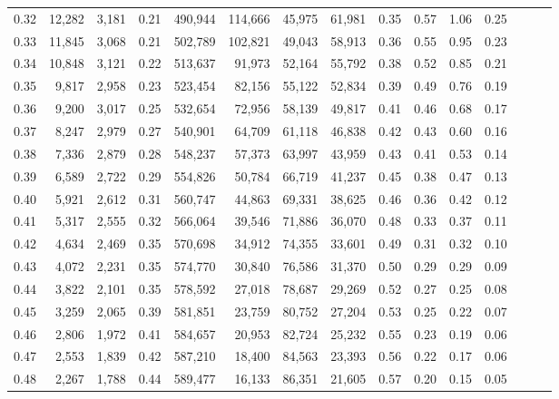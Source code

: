 \begin{tabular}{rrrrrrrrrrrrrrr}
0.32 &  12,282 &  3,181 &  0.21 &  490,944 &  114,666 &   45,975 &   61,981 &  0.35 &  0.57 &  1.06 &      0.25 \\
0.33 &  11,845 &  3,068 &  0.21 &  502,789 &  102,821 &   49,043 &   58,913 &  0.36 &  0.55 &  0.95 &      0.23 \\
0.34 &  10,848 &  3,121 &  0.22 &  513,637 &   91,973 &   52,164 &   55,792 &  0.38 &  0.52 &  0.85 &      0.21 \\
0.35 &   9,817 &  2,958 &  0.23 &  523,454 &   82,156 &   55,122 &   52,834 &  0.39 &  0.49 &  0.76 &      0.19 \\
0.36 &   9,200 &  3,017 &  0.25 &  532,654 &   72,956 &   58,139 &   49,817 &  0.41 &  0.46 &  0.68 &      0.17 \\
0.37 &   8,247 &  2,979 &  0.27 &  540,901 &   64,709 &   61,118 &   46,838 &  0.42 &  0.43 &  0.60 &      0.16 \\
0.38 &   7,336 &  2,879 &  0.28 &  548,237 &   57,373 &   63,997 &   43,959 &  0.43 &  0.41 &  0.53 &      0.14 \\
0.39 &   6,589 &  2,722 &  0.29 &  554,826 &   50,784 &   66,719 &   41,237 &  0.45 &  0.38 &  0.47 &      0.13 \\
0.40 &   5,921 &  2,612 &  0.31 &  560,747 &   44,863 &   69,331 &   38,625 &  0.46 &  0.36 &  0.42 &      0.12 \\
0.41 &   5,317 &  2,555 &  0.32 &  566,064 &   39,546 &   71,886 &   36,070 &  0.48 &  0.33 &  0.37 &      0.11 \\
0.42 &   4,634 &  2,469 &  0.35 &  570,698 &   34,912 &   74,355 &   33,601 &  0.49 &  0.31 &  0.32 &      0.10 \\
0.43 &   4,072 &  2,231 &  0.35 &  574,770 &   30,840 &   76,586 &   31,370 &  0.50 &  0.29 &  0.29 &      0.09 \\
0.44 &   3,822 &  2,101 &  0.35 &  578,592 &   27,018 &   78,687 &   29,269 &  0.52 &  0.27 &  0.25 &      0.08 \\
0.45 &   3,259 &  2,065 &  0.39 &  581,851 &   23,759 &   80,752 &   27,204 &  0.53 &  0.25 &  0.22 &      0.07 \\
0.46 &   2,806 &  1,972 &  0.41 &  584,657 &   20,953 &   82,724 &   25,232 &  0.55 &  0.23 &  0.19 &      0.06 \\
0.47 &   2,553 &  1,839 &  0.42 &  587,210 &   18,400 &   84,563 &   23,393 &  0.56 &  0.22 &  0.17 &      0.06 \\
0.48 &   2,267 &  1,788 &  0.44 &  589,477 &   16,133 &   86,351 &   21,605 &  0.57 &  0.20 &  0.15 &      0.05 \\

\end{tabular}
